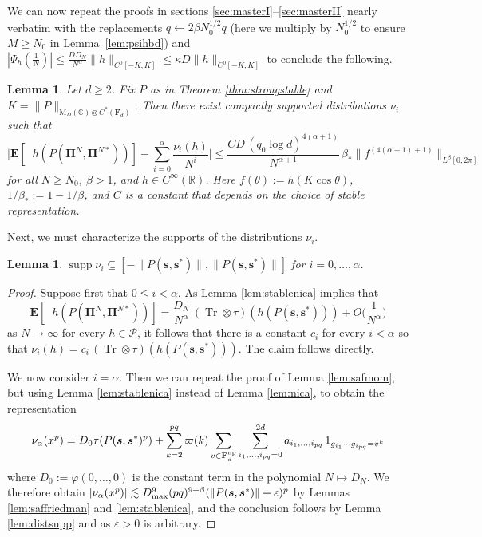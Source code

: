\documentclass[10pt,reqno]{amsart}
\newtheorem{lem}[thm]{Lemma}
\theoremstyle{definition}
\theoremstyle{remark}
\numberwithin{equation}{section}
\numberwithin{figure}{section}
\numberwithin{table}{section}
\newcommand{\supp}{\mathop{\mathrm{supp}}}
\newcommand{\tr}{\mathop{\mathrm{Tr}}}
\newcommand{\ntrNalp}{\mathop{\mathrm{tr}_{N^\alpha}}}
\newcommand{\EE}{\mathbf{E}}
\begin{document}
We can now repeat the proofs in sections 
\ref{sec:masterI}--\ref{sec:masterII} nearly verbatim with the 
replacements $q\leftarrow 
2\beta N_0^{1/2}q$ (here we multiply by $N_0^{1/2}$ to 
ensure $M\ge N_0$ in Lemma~\ref{lem:psihbd}) and 
$|\Psi_h(\frac{1}{N})|\le \frac{DD_N}{N^\alpha} \|h\|_{C^0[-K,K]}\le 
\kappa D \|h\|_{C^0[-K,K]}$ to conclude the following.

\begin{lem}
\label{lem:smmasterstable}
Let $d\ge 2$. Fix $P$ as in Theorem \ref{thm:strongstable} and
$K=\|P\|_{\mathrm{M}_D(\mathbb{C})\otimes C^*(\mathbf{F}_d)}$.
Then there exist compactly supported
distributions $\nu_i$ such that
$$
        \bigg|\EE[
        \ntrNalp h(P(\boldsymbol{\Pi}^N,\boldsymbol{\Pi}^{N*}))]
        - \sum_{i=0}^{\alpha} \frac{\nu_i(h)}{N^i}
        \bigg|
        \le
        \frac{CD\,(q_0\log d)^{4(\alpha+1)}}{N^{\alpha+1}}
        \,\beta_*\|f^{(4(\alpha+1)+1)}\|_{L^\beta[0,2\pi]}
$$
for all $N\ge N_0$, $\beta>1$, and $h\in C^\infty(\mathbb{R})$.
Here $f(\theta):=h(K\cos\theta)$, $1/\beta_*:=1-1/\beta$, and $C$ is a
constant that depends on the choice of stable representation.
\end{lem}

Next, we must characterize the supports of the distributions
$\nu_i$.

\begin{lem}
\label{lem:stablesupp}
$\supp \nu_i \subseteq [-\|P(\boldsymbol{s},\boldsymbol{s}^*)\|,
\|P(\boldsymbol{s},\boldsymbol{s}^*)\|]$ for $i=0,\ldots,\alpha$.
\end{lem}

\begin{proof}
Suppose first that $0\le i<\alpha$.
As Lemma \ref{lem:stablenica} implies that
$$
	\mathbf{E}[\ntrNalp h(P(\boldsymbol{\Pi}^N,\boldsymbol{\Pi}^{N*}))] 
=
	\frac{D_N}{N^\alpha}\,
	(\tr\otimes\tau)(h(P(\boldsymbol{s},\boldsymbol{s}^*)))
	+ O\bigg(\frac{1}{N^\alpha}\bigg)
$$
as $N\to\infty$ for every $h\in\mathcal{P}$, it follows that there is a 
constant $c_i$ for every $i<\alpha$ so that 
$\nu_i(h)=c_i\,(\tr\otimes\tau)(h(P(\boldsymbol{s},\boldsymbol{s}^*)))$. 
The claim follows directly.

We now consider $i=\alpha$. Then we can repeat the proof of Lemma 
\ref{lem:safmom}, but using Lemma \ref{lem:stablenica} instead of
Lemma \ref{lem:nica}, to obtain the representation
$$
        \nu_\alpha(x^p) = D_0\tau(P(\boldsymbol{s},\boldsymbol{s}^*)^p) +
        \sum_{k=2}^{pq} \varpi(k)
	\sum_{v\in\mathbf{F}_d^{\rm np}}
        \sum_{i_1,\ldots,i_{pq}=0}^{2d}
	a_{i_1,\ldots,i_{pq}}\,
        1_{g_{i_1}\cdots g_{i_{pq}}=v^k}
$$
where $D_0 := \varphi(0,\ldots,0)$ is the constant term in the polynomial 
$N\mapsto D_N$. We therefore obtain
$|\nu_\alpha(x^p)| \lesssim D_{\rm max}^9
(pq)^{9+\beta}(\|P(\boldsymbol{s},\boldsymbol{s}^*)\|+\varepsilon)^p$
by Lemmas \ref{lem:saffriedman} and \ref{lem:stablenica}, and
the conclusion follows by Lemma \ref{lem:distsupp} and as
$\varepsilon>0$ is arbitrary.
\end{proof}
\end{document}
